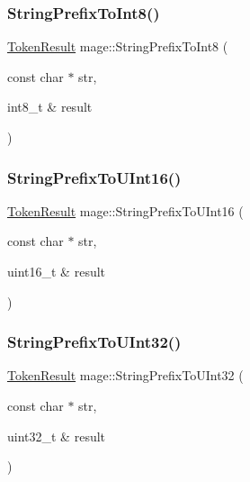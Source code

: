 \hypertarget{namespacemage_ab2a4f965199e2efba23cbbd052a66283}{}\label{namespacemage_ab2a4f965199e2efba23cbbd052a66283} 
\subsubsection{\texorpdfstring{String\+Prefix\+To\+Int8()}{StringPrefixToInt8()}}
{\footnotesize\ttfamily \hyperlink{namespacemage_a2178ba2411db5912f41b2e7698c2037d}{Token\+Result} mage\+::\+String\+Prefix\+To\+Int8 (\begin{DoxyParamCaption}\item[{const char $\ast$}]{str,  }\item[{int8\+\_\+t \&}]{result }\end{DoxyParamCaption})}

\hypertarget{namespacemage_a59f623733dd4ad636de4cea46467da7d}{}\label{namespacemage_a59f623733dd4ad636de4cea46467da7d} 
\subsubsection{\texorpdfstring{String\+Prefix\+To\+U\+Int16()}{StringPrefixToUInt16()}}
{\footnotesize\ttfamily \hyperlink{namespacemage_a2178ba2411db5912f41b2e7698c2037d}{Token\+Result} mage\+::\+String\+Prefix\+To\+U\+Int16 (\begin{DoxyParamCaption}\item[{const char $\ast$}]{str,  }\item[{uint16\+\_\+t \&}]{result }\end{DoxyParamCaption})}

\hypertarget{namespacemage_a7843190a71ad080e1ae5e5f1ca518db9}{}\label{namespacemage_a7843190a71ad080e1ae5e5f1ca518db9} 
\subsubsection{\texorpdfstring{String\+Prefix\+To\+U\+Int32()}{StringPrefixToUInt32()}}
{\footnotesize\ttfamily \hyperlink{namespacemage_a2178ba2411db5912f41b2e7698c2037d}{Token\+Result} mage\+::\+String\+Prefix\+To\+U\+Int32 (\begin{DoxyParamCaption}\item[{const char $\ast$}]{str,  }\item[{uint32\+\_\+t \&}]{result }\end{DoxyParamCaption})}

